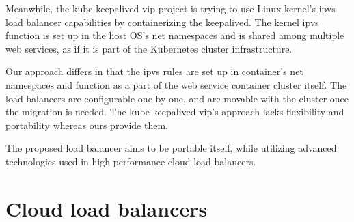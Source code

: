 Meanwhile, the kube-keepalived-vip\cite{Prashanth2016} project is trying to use Linux kernel's ipvs\cite{Zhang2000} 
load balancer capabilities by containerizing the keepalived\cite{ACassen2016}.
The kernel ipvs function is set up in the host OS's net namespaces and is shared among multiple web services,
as if it is part of the Kubernetes cluster infrastructure.

Our approach differs in that the ipvs rules are set up in container's net namespaces 
and function as a part of the web service container cluster itself.
The load balancers are configurable one by one, and are  movable with the cluster once the migration is needed.
The kube-keepalived-vip's approach lacks flexibility and portability whereas ours provide them.

\begin{table}[h]
  \centering

  \par\bigskip
  \begin{minipage}{0.9\columnwidth}
    \caption[Ingress routing techniques for Kubernetes]{
    Ingress routing techniques for Kubernetes.
    }   
    \label{tabl:k8s_lb}
  \end{minipage}

\end{table}

The proposed load balancer aims to be portable itself, while utilizing advanced technologies used in high performance cloud load balancers.

\section{Cloud load balancers}

